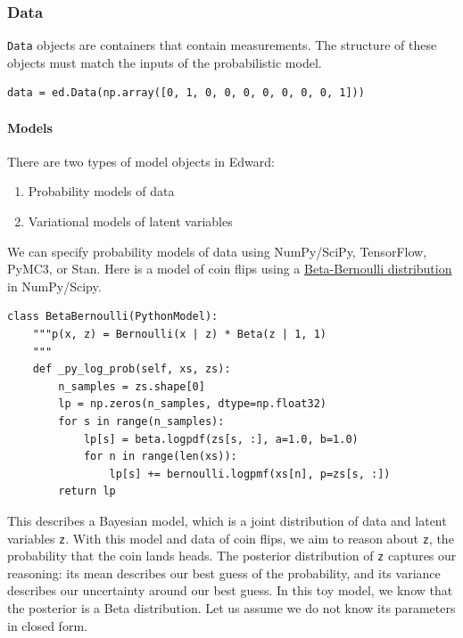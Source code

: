 \subsubsection{Data}

\texttt{Data} objects are containers that contain measurements. The
structure of these objects must match the inputs of the probabilistic
model.

\begin{verbatim}
data = ed.Data(np.array([0, 1, 0, 0, 0, 0, 0, 0, 0, 1]))
\end{verbatim}

\paragraph{Models}\label{models}

There are two types of model objects in Edward:

\begin{enumerate}
\def\labelenumi{\arabic{enumi}.}
\tightlist
\item
  Probability models of data
\item
  Variational models of latent variables
\end{enumerate}

We can specify probability models of data using NumPy/SciPy, TensorFlow,
PyMC3, or Stan. Here is a model of coin flips using a
\href{https://en.wikipedia.org/wiki/Beta-binomial_distribution}{Beta-Bernoulli
distribution} in NumPy/Scipy.

\begin{verbatim}
class BetaBernoulli(PythonModel):
    """p(x, z) = Bernoulli(x | z) * Beta(z | 1, 1)
    """
    def _py_log_prob(self, xs, zs):
        n_samples = zs.shape[0]
        lp = np.zeros(n_samples, dtype=np.float32)
        for s in range(n_samples):
            lp[s] = beta.logpdf(zs[s, :], a=1.0, b=1.0)
            for n in range(len(xs)):
                lp[s] += bernoulli.logpmf(xs[n], p=zs[s, :])
        return lp
\end{verbatim}

This describes a Bayesian model, which is a joint distribution of data
and latent variables \texttt{z}. With this model and data of coin flips,
we aim to reason about \texttt{z}, the probability that the coin lands
heads. The posterior distribution of \texttt{z} captures our reasoning:
its mean describes our best guess of the probability, and its variance
describes our uncertainty around our best guess. In this toy model, we
know that the posterior is a Beta distribution. Let us assume we do not
know its parameters in closed form.


